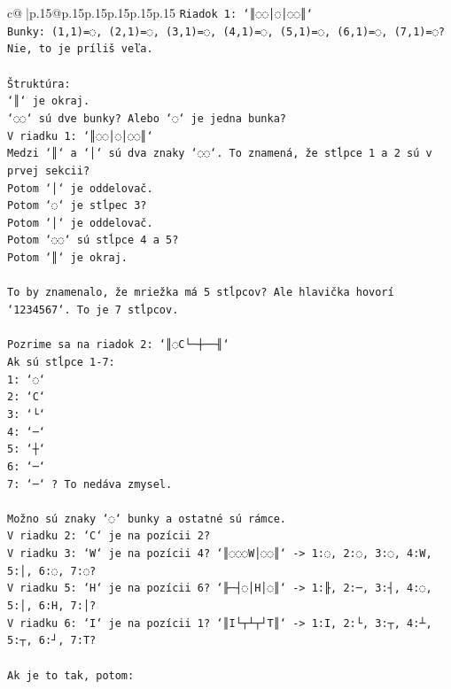 \documentclass{article}
\begin{document}
{\begin{supertabular}{c@{$\;$}|p{.15\linewidth}@{}p{.15\linewidth}p{.15\linewidth}p{.15\linewidth}p{.15\linewidth}p{.15\linewidth}}
{{{\texttt{Riadok 1: `║◌◌│◌│◌◌║`} \\
\texttt{Bunky: (1,1)=◌, (2,1)=◌, (3,1)=◌, (4,1)=◌, (5,1)=◌, (6,1)=◌, (7,1)=◌? Nie, to je príliš veľa.} \\
\\ 
\texttt{Štruktúra:} \\
\texttt{`║` je okraj.} \\
\texttt{`◌◌` sú dve bunky? Alebo `◌` je jedna bunka?} \\
\texttt{V riadku 1: `║◌◌│◌│◌◌║`} \\
\texttt{Medzi `║` a `│` sú dva znaky `◌◌`. To znamená, že stĺpce 1 a 2 sú v prvej sekcii?} \\
\texttt{Potom `│` je oddelovač.} \\
\texttt{Potom `◌` je stĺpec 3?} \\
\texttt{Potom `│` je oddelovač.} \\
\texttt{Potom `◌◌` sú stĺpce 4 a 5?} \\
\texttt{Potom `║` je okraj.} \\
\\ 
\texttt{To by znamenalo, že mriežka má 5 stĺpcov? Ale hlavička hovorí `1234567`. To je 7 stĺpcov.} \\
\\ 
\texttt{Pozrime sa na riadok 2: `║◌C└─┼──╢`} \\
\texttt{Ak sú stĺpce 1{-}7:} \\
\texttt{1: `◌`} \\
\texttt{2: `C`} \\
\texttt{3: `└`} \\
\texttt{4: `─`} \\
\texttt{5: `┼`} \\
\texttt{6: `─`} \\
\texttt{7: `─` ? To nedáva zmysel.} \\
\\ 
\texttt{Možno sú znaky `◌` bunky a ostatné sú rámce.} \\
\texttt{V riadku 2: `C` je na pozícii 2?} \\
\texttt{V riadku 3: `W` je na pozícii 4? `║◌◌◌W│◌◌║` {-}> 1:◌, 2:◌, 3:◌, 4:W, 5:│, 6:◌, 7:◌?} \\
\texttt{V riadku 5: `H` je na pozícii 6? `╟─┤◌│H│◌║` {-}> 1:╟, 2:─, 3:┤, 4:◌, 5:│, 6:H, 7:│?} \\
\texttt{V riadku 6: `I` je na pozícii 1? `║I└┬┴┬┘T║` {-}> 1:I, 2:└, 3:┬, 4:┴, 5:┬, 6:┘, 7:T?} \\
\\ 
\texttt{Ak je to tak, potom:} \\
}}}
\end{supertabular}}
\end{document}
